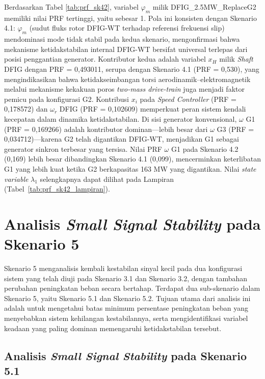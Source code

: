 Berdasarkan Tabel \ref{tab:prf_sk42}, variabel $\varphi_m$ milik
DFIG\_2.5MW\_ReplaceG2 memiliki nilai PRF tertinggi, yaitu sebesar 1. Pola ini
konsisten dengan Skenario 4.1: $\varphi_m$ (sudut fluks rotor DFIG-WT terhadap
referensi frekuensi slip) mendominasi mode tidak stabil pada kedua skenario,
mengonfirmasi bahwa mekanisme ketidakstabilan internal DFIG-WT bersifat
universal terlepas dari posisi penggantian generator. Kontributor kedua adalah
variabel $x_H$ milik \textit{Shaft} DFIG dengan PRF = 0,493011, serupa dengan
Skenario 4.1 (PRF = 0,530), yang mengindikasikan bahwa ketidakseimbangan
torsi aerodinamik--elektromagnetik melalui mekanisme kekakuan poros
\textit{two-mass drive-train} juga menjadi faktor pemicu pada konfigurasi G2.
Kontribusi $x_i$ pada \textit{Speed Controller} (PRF = 0,178572) dan
$\omega_r$ DFIG (PRF = 0,102609) memperkuat peran sistem kendali kecepatan
dalam dinamika ketidakstabilan. Di sisi generator konvensional, $\omega$ G1
(PRF = 0,169266) adalah kontributor dominan---lebih besar dari $\omega$ G3
(PRF = 0,034712)---karena G2 telah digantikan DFIG-WT, menjadikan G1 sebagai
generator sinkron terbesar yang tersisa. Nilai PRF $\omega$ G1 pada Skenario
4.2 (0,169) lebih besar dibandingkan Skenario 4.1 (0,099), mencerminkan
keterlibatan G1 yang lebih kuat ketika G2 berkapasitas 163 MW yang digantikan.
Nilai \textit{state variable} $\lambda_1$ selengkapnya dapat dilihat pada
Lampiran (Tabel~\ref{tab:prf_sk42_lampiran}).

\section{Analisis \textit{Small Signal Stability} pada Skenario 5}

Skenario 5 menganalisis kembali kestabilan sinyal kecil pada dua konfigurasi
sistem yang telah diuji pada Skenario 3.1 dan Skenario 3.2, dengan tambahan
perubahan peningkatan beban secara bertahap. Terdapat dua sub-skenario dalam
Skenario 5, yaitu Skenario 5.1 dan Skenario 5.2. Tujuan utama dari analisis ini
adalah untuk mengetahui batas minimum persentase peningkatan beban yang
menyebabkan sistem kehilangan kestabilannya, serta mengidentifikasi variabel
keadaan yang paling dominan memengaruhi ketidakstabilan tersebut.

\subsection{Analisis \textit{Small Signal Stability} pada Skenario 5.1}

